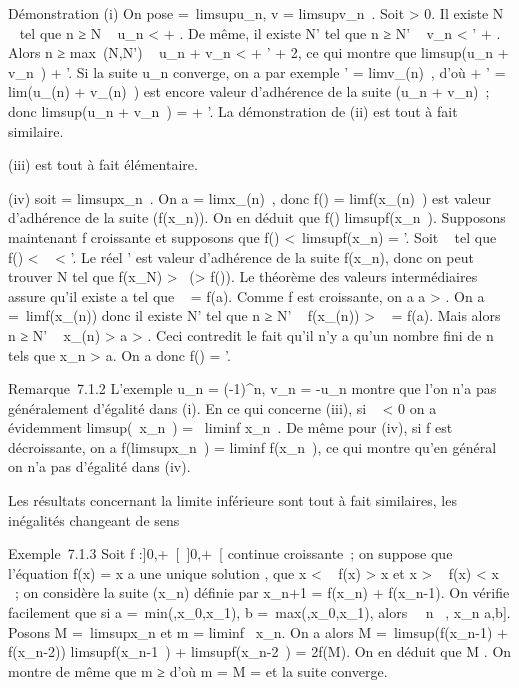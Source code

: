 \documentclass[]{article}
\begin{document}
Démonstration (i) On pose \ell =\
limsupu_n, v = limsupv_n~.
Soit \epsilon \textgreater{} 0. Il existe N \in {}~ tel que n ≥ N \rigtharrow~ u_n
\textless{} \ell + \epsilon. De même, il existe N' tel que n ≥ N' \rigtharrow~ v_n
\textless{} \ell' + \epsilon. Alors n ≥ max~(N,N') \rigtharrow~
u_n + v_n \textless{} \ell + \ell' + 2\epsilon, ce qui montre que
limsup(u_n + v_n~) \leq \ell + \ell'.
Si la suite u_n converge, on a par exemple \ell'
= limv_\phi(n)~, d'où \ell + \ell'
= lim(u_\phi(n) + v_\phi(n)~) est
encore valeur d'adhérence de la suite (u_n + v_n)~;
donc limsup(u_n + v_n~) = \ell +
\ell'. La démonstration de (ii) est tout à fait similaire.

(iii) est tout à fait élémentaire.

(iv) soit \ell = limsupx_n~. On a \ell
= limx_\phi(n)~, donc f(\ell)
= limf(x_\phi(n)~) est valeur d'adhérence
de la suite (f(x_n)). On en déduit que f(\ell)
\leq limsupf(x_n~). Supposons maintenant
f croissante et supposons que f(\ell) \textless{}\
limsupf(x_n) = \ell'. Soit \alpha~ tel que f(\ell) \textless{} \alpha~
\textless{} \ell'. Le réel \ell' est valeur d'adhérence de la suite
f(x_n), donc on peut trouver N tel que f(x_N)
\textgreater{} \alpha~(\textgreater{} f(\ell)). Le théorème des valeurs
intermédiaires assure qu'il existe a tel que \alpha~ = f(a). Comme f est
croissante, on a a \textgreater{} \ell. On a \ell =\
limf(x_\phi(n)) donc il existe N' tel que n ≥ N' \rigtharrow~
f(x_\phi(n)) \textgreater{} \alpha~ = f(a). Mais alors n ≥ N' \rigtharrow~
x_\phi(n) \textgreater{} a \textgreater{} \ell. Ceci contredit le
fait qu'il n'y a qu'un nombre fini de n tels que x_n
\textgreater{} a. On a donc f(\ell) = \ell'.

Remarque~7.1.2 L'exemple u_n = (-1)^n, v_n
= -u_n montre que l'on n'a pas généralement d'égalité dans (i).
En ce qui concerne (iii), si \lambda~ \textless{} 0 on a évidemment
limsup(\lambda~x_n~) =
\lambda~liminf x_n~. De même pour (iv), si f
est décroissante, on a f(limsupx_n~)
= liminf f(x_n~), ce qui montre qu'en
général on n'a pas d'égalité dans (iv).

Les résultats concernant la limite inférieure sont tout à fait
similaires, les inégalités changeant de sens

Exemple~7.1.3 Soit f :{]}0,+\infty~{[}\rightarrow~{]}0,+\infty~{[} continue croissante~; on
suppose que l'équation f(x) = x  a une unique
solution \ell, que x \textless{} \ell \rigtharrow~ f(x) \textgreater{} x
\over 2 et x \textgreater{} \ell \rigtharrow~ f(x) \textless{} x
\over 2 ~; on considère la suite (x_n) définie
par x_n+1 = f(x_n) + f(x_n-1). On vérifie
facilement que si a =\
min(\ell,x_0,x_1), b =\
max(\ell,x_0,x_1), alors \forall~~n \in
\mathbb{N}~, x_n \in {[}a,b{]}. Posons M =\
limsupx_n et m = liminf~
x_n. On a alors M =\
limsup(f(x_n-1) + f(x_n-2))
\leq limsupf(x_n-1~)
+ limsupf(x_n-2~) = 2f(M). On en
déduit que M \leq \ell. On montre de même que m ≥ \ell d'où m = M = \ell et la suite
converge.
\end{document}
